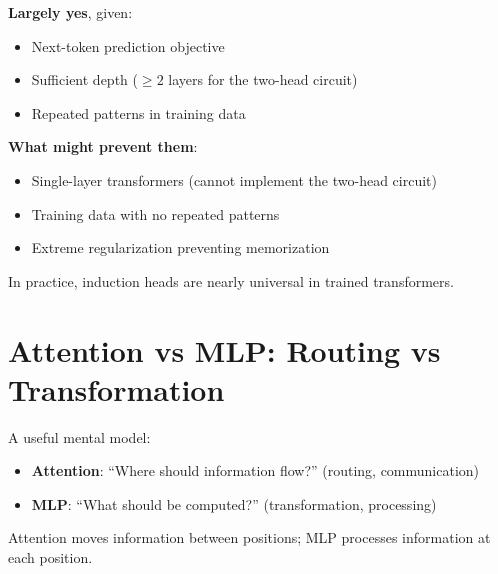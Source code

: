 \begin{remark}
    \textbf{Largely yes}, given:
    \begin{itemize}
        \item Next-token prediction objective
        \item Sufficient depth ($\geq 2$ layers for the two-head circuit)
        \item Repeated patterns in training data
    \end{itemize}

    \textbf{What might prevent them}:
    \begin{itemize}
        \item Single-layer transformers (cannot implement the two-head circuit)
        \item Training data with no repeated patterns
        \item Extreme regularization preventing memorization
    \end{itemize}

    In practice, induction heads are nearly universal in trained transformers.
\end{remark}

\section{Attention vs MLP: Routing vs Transformation}

\begin{remark}
    A useful mental model:
    \begin{itemize}
        \item \textbf{Attention}: ``Where should information flow?'' (routing, communication)
        \item \textbf{MLP}: ``What should be computed?'' (transformation, processing)
    \end{itemize}

    Attention moves information between positions; MLP processes information at each position.
\end{remark}

